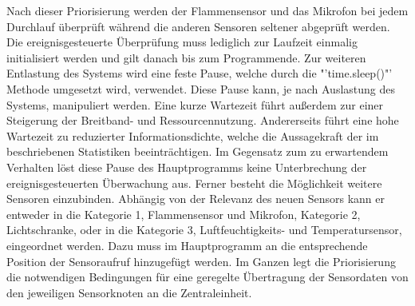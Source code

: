 Nach dieser Priorisierung werden der Flammensensor und das Mikrofon bei jedem Durchlauf überprüft während die anderen Sensoren seltener abgeprüft werden. Die ereignisgesteuerte Überprüfung muss lediglich zur Laufzeit einmalig initialisiert werden und gilt danach bis zum Programmende. Zur weiteren Entlastung des Systems wird eine feste Pause, welche durch die "'time.sleep()"' Methode umgesetzt wird, verwendet. Diese Pause kann, je nach Auslastung des Systems, manipuliert werden. Eine kurze Wartezeit führt außerdem zur einer Steigerung der Breitband- und Ressourcennutzung. Andererseits führt eine hohe Wartezeit zu reduzierter Informationsdichte, welche die Aussagekraft der im  beschriebenen Statistiken beeinträchtigen. Im Gegensatz zum zu erwartendem Verhalten löst diese Pause des Hauptprogramms keine Unterbrechung der ereignisgesteuerten Überwachung aus. Ferner besteht die Möglichkeit weitere Sensoren einzubinden. Abhängig von der Relevanz des neuen Sensors kann er entweder in die Kategorie 1, Flammensensor und Mikrofon, Kategorie 2, Lichtschranke, oder in die Kategorie 3, Luftfeuchtigkeits- und Temperatursensor, eingeordnet werden. Dazu muss im Hauptprogramm an die entsprechende Position der Sensoraufruf hinzugefügt werden. Im Ganzen legt die Priorisierung die notwendigen Bedingungen für eine geregelte Übertragung der Sensordaten von den jeweiligen Sensorknoten an die Zentraleinheit.

